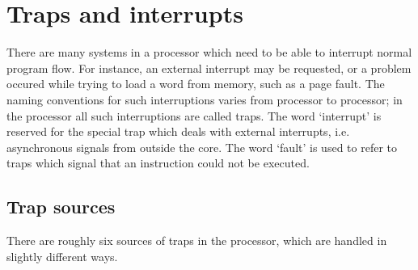 
\clearpage
\section{Traps and interrupts}
\label{sec:core-ug-traps}

There are many systems in a processor which need to be able to interrupt normal
program flow. For instance, an external interrupt may be requested, or a problem
occured while trying to load a word from memory, such as a page fault. The
naming conventions for such interruptions varies from processor to processor; in
the \rvex{} processor all such interruptions are called traps. The word
`interrupt' is reserved for the special trap which deals with external
interrupts, i.e. asynchronous signals from outside the core. The word `fault' is
used to refer to traps which signal that an instruction could not be executed.

\subsection{Trap sources}
\label{sec:core-ug-traps-sources}

There are roughly six sources of traps in the \rvex{} processor, which are
handled in slightly different ways.

